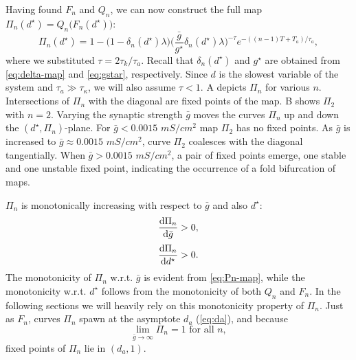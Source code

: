Having found $F_n$ and $Q_n$, we can now construct the full map $\Pi_n(d^\star)=Q_n\big(F_n(d^\star)\big)$:
\begin{equation}
	\label{eq:Pn-map}
	\Pi_n(d^\star) = 1 - \Big(1 - \delta_n(d^\star) \lambda \Big)
	\Big(\frac{\bar g}{g^\star}\delta_n(d^\star) \lambda \Big)^{-\tau}
	e^{-((n-1)T + T_{a})/\tau_a},
\end{equation}
where we substituted $\tau = 2\tau_{k}/\tau_{a}$.
Recall that $\delta_{n}(d^{\star})$ and $g^{\star}$ are obtained from \cref{eq:delta-map} and \cref{eq:gstar}, respectively.
Since $d$ is the slowest variable of the system and $\tau_a \gg \tau_\kappa$, we will also assume $\tau<1$.
A depicts $\Pi_n$ for various $n$.
Intersections of $\Pi_{n}$ with the diagonal are fixed points of the map.
B shows $\Pi_{2}$ with $n=2$.
Varying the synaptic strength $\bar g$ moves the curves $\Pi_{n}$ up and down the $(d^{\star}, \Pi_{n})$-plane.
For $\bar g < 0.0015$ $\si{mS/cm^{2}}$ map $\Pi_{2}$ has no fixed points.
As $\bar g$ is increased to $\bar g \approx 0.0015$ $\si{mS/cm^{2}}$, curve $\Pi_{2}$ coalesces with the diagonal tangentially.
When $\bar g > 0.0015$ $\si{mS/cm^{2}}$, a pair of fixed points emerge, one stable and one unstable fixed point, indicating the occurrence of a fold bifurcation of maps.


$\Pi_n$ is monotonically increasing with respect to $\bar g$ and also $d^\star$:
\begin{align}
	\label{eq:non-degen1}
	\dv{\Pi_n}{\bar g}  & >0, \\[0.5ex]
	\label{eq:dPidd}
	\dv{\Pi_n}{d^\star} & >0.
\end{align}
\noindent
The monotonicity of $\Pi_{n}$ w.r.t. $\bar g$ is evident from \cref{eq:Pn-map}, while the monotonicity w.r.t. $d^{\star}$ follows from the monotonicity of both $Q_{n}$ and $F_{n}$.
In the following sections we will heavily rely on this monotonicity property of $\Pi_n$.
Just as $F_n$, curves $\Pi_n$ spawn at the asymptote $d_{a}$ (\cref{eq:da}), and because
\begin{equation}
	\lim_{\bar g \to \infty}\Pi_n = 1\text{ for all }n,
\end{equation}
fixed points of $\Pi_n$ lie in $(d_{a}, 1)$.

